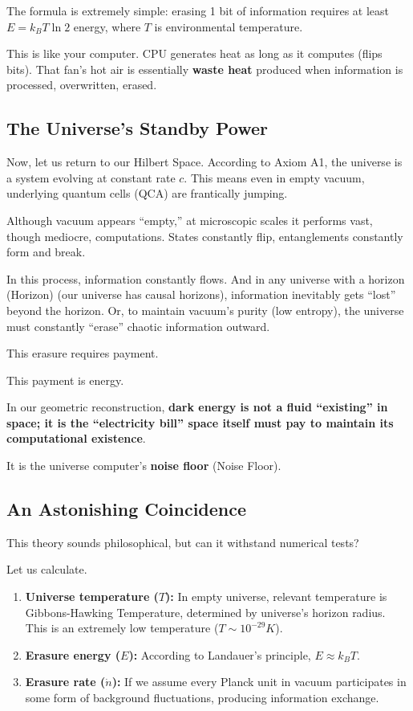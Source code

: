 The formula is extremely simple: erasing 1 bit of information requires at least $E = k_B T \ln 2$ energy, where $T$ is environmental temperature.

This is like your computer. CPU generates heat as long as it computes (flips bits). That fan's hot air is essentially \textbf{waste heat} produced when information is processed, overwritten, erased.

\subsection{The Universe's Standby Power}

Now, let us return to our Hilbert Space. According to Axiom A1, the universe is a system evolving at constant rate $c$. This means even in empty vacuum, underlying quantum cells (QCA) are frantically jumping.

Although vacuum appears ``empty,'' at microscopic scales it performs vast, though mediocre, computations. States constantly flip, entanglements constantly form and break.

In this process, information constantly flows. And in any universe with a horizon (Horizon) (our universe has causal horizons), information inevitably gets ``lost'' beyond the horizon. Or, to maintain vacuum's purity (low entropy), the universe must constantly ``erase'' chaotic information outward.

This erasure requires payment.

This payment is energy.

In our geometric reconstruction, \textbf{dark energy is not a fluid ``existing'' in space; it is the ``electricity bill'' space itself must pay to maintain its computational existence}.

It is the universe computer's \textbf{noise floor} (Noise Floor).

\subsection{An Astonishing Coincidence}

This theory sounds philosophical, but can it withstand numerical tests?

Let us calculate.

\begin{enumerate}
\item \textbf{Universe temperature ($T$):} In empty universe, relevant temperature is Gibbons-Hawking Temperature, determined by universe's horizon radius. This is an extremely low temperature ($T \sim 10^{-29} K$).

\item \textbf{Erasure energy ($E$):} According to Landauer's principle, $E \approx k_B T$.

\item \textbf{Erasure rate ($\dot{n}$):} If we assume every Planck unit in vacuum participates in some form of background fluctuations, producing information exchange.
\end{enumerate}

